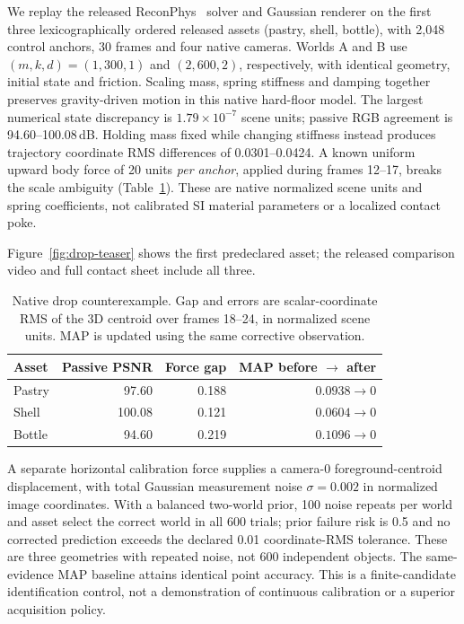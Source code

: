 We replay the released ReconPhys~\cite{reconphys} solver and Gaussian renderer on the first three lexicographically ordered released assets (pastry, shell, bottle), with 2,048 control anchors, 30 frames and four native cameras. Worlds A and B use $(m,k,d)=(1,300,1)$ and $(2,600,2)$, respectively, with identical geometry, initial state and friction. Scaling mass, spring stiffness and damping together preserves gravity-driven motion in this native hard-floor model. The largest numerical state discrepancy is $1.79\times10^{-7}$ scene units; passive RGB agreement is 94.60--100.08\,dB. Holding mass fixed while changing stiffness instead produces trajectory coordinate RMS differences of 0.0301--0.0424. A known uniform upward body force of 20 units \emph{per anchor}, applied during frames 12--17, breaks the scale ambiguity (Table~\ref{tab:drop}). These are native normalized scene units and spring coefficients, not calibrated SI material parameters or a localized contact poke.

Figure~\ref{fig:drop-teaser} shows the first predeclared asset; the released comparison video and full contact sheet include all three.

\begin{table}[t]
\centering\small\setlength{\tabcolsep}{3pt}
\caption{Native drop counterexample. Gap and errors are scalar-coordinate RMS of the 3D centroid over frames 18--24, in normalized scene units. MAP is updated using the same corrective observation.}
\label{tab:drop}
\begin{tabular}{lrrr}\toprule
Asset & Passive PSNR & Force gap & MAP before $\to$ after\\\midrule
Pastry & 97.60 & 0.188 & $0.0938\to0$\\
Shell & 100.08 & 0.121 & $0.0604\to0$\\
Bottle & 94.60 & 0.219 & $0.1096\to0$\\\bottomrule
\end{tabular}
\end{table}
A separate horizontal calibration force supplies a camera-0 foreground-centroid displacement, with total Gaussian measurement noise $\sigma=0.002$ in normalized image coordinates. With a balanced two-world prior, 100 noise repeats per world and asset select the correct world in all 600 trials; prior failure risk is 0.5 and no corrected prediction exceeds the declared 0.01 coordinate-RMS tolerance. These are three geometries with repeated noise, not 600 independent objects. The same-evidence MAP baseline attains identical point accuracy. This is a finite-candidate identification control, not a demonstration of continuous calibration or a superior acquisition policy.

